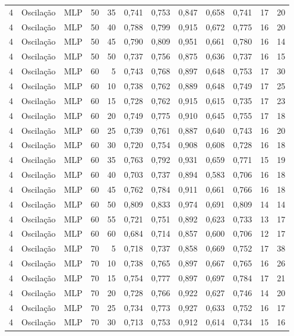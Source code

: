 \begin{longtable}{ccclrrrrrrrr}
4 & Oscilação & MLP & 50 & 35 & 0,741 & 0,753 & 0,847 & 0,658 & 0,741 & 17 & 20 \\
4 & Oscilação & MLP & 50 & 40 & 0,788 & 0,799 & 0,915 & 0,672 & 0,775 & 16 & 20 \\
4 & Oscilação & MLP & 50 & 45 & 0,790 & 0,809 & 0,951 & 0,661 & 0,780 & 16 & 14 \\
4 & Oscilação & MLP & 50 & 50 & 0,737 & 0,756 & 0,875 & 0,636 & 0,737 & 16 & 15 \\
4 & Oscilação & MLP & 60 & 5 & 0,743 & 0,768 & 0,897 & 0,648 & 0,753 & 17 & 30 \\
4 & Oscilação & MLP & 60 & 10 & 0,738 & 0,762 & 0,889 & 0,648 & 0,749 & 17 & 25 \\
4 & Oscilação & MLP & 60 & 15 & 0,728 & 0,762 & 0,915 & 0,615 & 0,735 & 17 & 23 \\
4 & Oscilação & MLP & 60 & 20 & 0,749 & 0,775 & 0,910 & 0,645 & 0,755 & 17 & 18 \\
4 & Oscilação & MLP & 60 & 25 & 0,739 & 0,761 & 0,887 & 0,640 & 0,743 & 16 & 20 \\
4 & Oscilação & MLP & 60 & 30 & 0,720 & 0,754 & 0,908 & 0,608 & 0,728 & 16 & 18 \\
4 & Oscilação & MLP & 60 & 35 & 0,763 & 0,792 & 0,931 & 0,659 & 0,771 & 15 & 19 \\
4 & Oscilação & MLP & 60 & 40 & 0,703 & 0,737 & 0,894 & 0,583 & 0,706 & 16 & 18 \\
4 & Oscilação & MLP & 60 & 45 & 0,762 & 0,784 & 0,911 & 0,661 & 0,766 & 16 & 18 \\
4 & Oscilação & MLP & 60 & 50 & 0,809 & 0,833 & 0,974 & 0,691 & 0,809 & 14 & 14 \\
4 & Oscilação & MLP & 60 & 55 & 0,721 & 0,751 & 0,892 & 0,623 & 0,733 & 13 & 17 \\
4 & Oscilação & MLP & 60 & 60 & 0,684 & 0,714 & 0,857 & 0,600 & 0,706 & 12 & 17 \\
4 & Oscilação & MLP & 70 & 5 & 0,718 & 0,737 & 0,858 & 0,669 & 0,752 & 17 & 38 \\
4 & Oscilação & MLP & 70 & 10 & 0,738 & 0,765 & 0,897 & 0,667 & 0,765 & 16 & 26 \\
4 & Oscilação & MLP & 70 & 15 & 0,754 & 0,777 & 0,897 & 0,697 & 0,784 & 17 & 21 \\
4 & Oscilação & MLP & 70 & 20 & 0,728 & 0,766 & 0,922 & 0,627 & 0,746 & 14 & 20 \\
4 & Oscilação & MLP & 70 & 25 & 0,734 & 0,773 & 0,927 & 0,633 & 0,752 & 16 & 17 \\
4 & Oscilação & MLP & 70 & 30 & 0,713 & 0,753 & 0,912 & 0,614 & 0,734 & 15 & 16 \\

\end{longtable}
